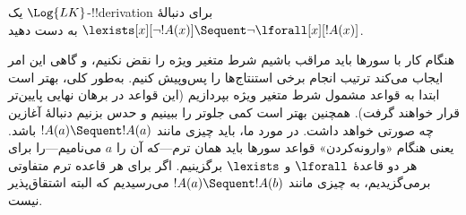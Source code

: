 \documentclass[../../../include/open-logic-section]{subfiles}
\begin{document}


\begin{ex}
یک $\Log{LK}$-!!{derivation} برای دنبالهٔ
$\lexists[x][\lnot !A(x)] \Sequent \lnot \lforall[x][!A(x)]$ به دست دهید.

هنگام کار با سورها باید مراقب باشیم شرط متغیر ویژه را نقض نکنیم، و
گاهی این امر ایجاب می‌کند ترتیب انجام برخی استنتاج‌ها را پس‌وپیش کنیم.
به‌طور کلی، بهتر است ابتدا به قواعد مشمول شرط متغیر ویژه بپردازیم
(این قواعد در برهان نهایی پایین‌تر قرار خواهند گرفت). همچنین بهتر است
کمی جلوتر را ببینیم و حدس بزنیم دنبالهٔ آغازین چه صورتی خواهد داشت.
در مورد ما، باید چیزی مانند $!A(a) \Sequent !A(a)$ باشد. یعنی هنگام
«وارونه‌کردن» قواعد سورها باید همان ترم---که آن را $a$ می‌نامیم---را
برای هر دو قاعدهٔ $\lforall$ و $\lexists$ برگزینیم. اگر برای
هر قاعده ترم متفاوتی برمی‌گزیدیم، به چیزی مانند
$!A(a) \Sequent !A(b)$ می‌رسیدیم که البته اشتقاق‌پذیر نیست.


\end{ex}
\end{document}
